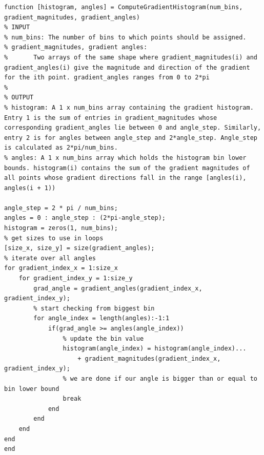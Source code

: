 \documentclass{article}
\begin{document}
\newpage

\begin{lstlisting}[caption={My implementation of ComputeGradientHistogram function.},captionpos=b]
function [histogram, angles] = ComputeGradientHistogram(num_bins, gradient_magnitudes, gradient_angles)
% INPUT
% num_bins: The number of bins to which points should be assigned.
% gradient_magnitudes, gradient angles:
%       Two arrays of the same shape where gradient_magnitudes(i) and gradient_angles(i) give the magnitude and direction of the gradient for the ith point. gradient_angles ranges from 0 to 2*pi
%
% OUTPUT
% histogram: A 1 x num_bins array containing the gradient histogram. Entry 1 is the sum of entries in gradient_magnitudes whose corresponding gradient_angles lie between 0 and angle_step. Similarly, entry 2 is for angles between angle_step and 2*angle_step. Angle_step is calculated as 2*pi/num_bins.
% angles: A 1 x num_bins array which holds the histogram bin lower bounds. histogram(i) contains the sum of the gradient magnitudes of all points whose gradient directions fall in the range [angles(i), angles(i + 1))

angle_step = 2 * pi / num_bins;
angles = 0 : angle_step : (2*pi-angle_step);
histogram = zeros(1, num_bins);
% get sizes to use in loops
[size_x, size_y] = size(gradient_angles);
% iterate over all angles
for gradient_index_x = 1:size_x
    for gradient_index_y = 1:size_y
        grad_angle = gradient_angles(gradient_index_x, gradient_index_y);
        % start checking from biggest bin
        for angle_index = length(angles):-1:1
            if(grad_angle >= angles(angle_index))
                % update the bin value
                histogram(angle_index) = histogram(angle_index)...
                    + gradient_magnitudes(gradient_index_x, gradient_index_y);
                % we are done if our angle is bigger than or equal to bin lower bound
                break
            end
        end
    end
end
end
\end{lstlisting}

\newpage
\end{document}
